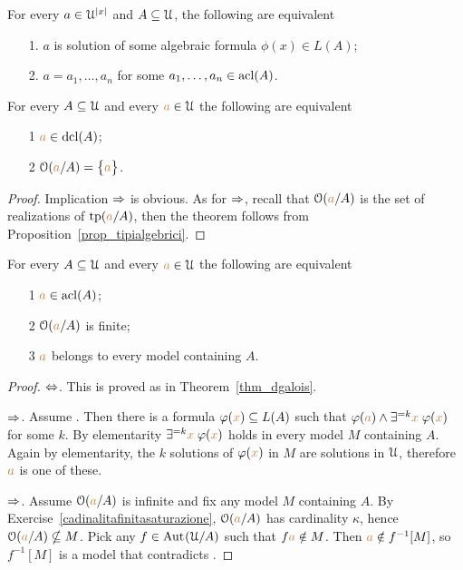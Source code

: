 \begin{exercise}
For every $a\in\EuScript U^{|x|}$ and $A\subseteq\EuScript U$, the following are equivalent
\begin{itemize}
\item[1.] $a$ is solution of some algebraic formula  $\phi(x)\in L(A)$;
\item[2.] $a=a_1,\dots,a_n$ for some $a_1,\dots,a_n\in\mathop{\rm acl}(A)$.\QED
\end{itemize}
\end{exercise}

\begin{theorem}\label{thm_dgalois}
For every $A\subseteq\EuScript U$ and every ${\color{brown} a}\in\EuScript U$ the following are equivalent
\begin{itemize}
\item[1] ${\color{brown} a}\in\mathop{\rm dcl}(A)$;
\item[2] $\EuScript O({\color{brown} a}/A)=\big\{{\color{brown} a}\big\}$.
\end{itemize}
\end{theorem}

\begin{proof} 
Implication $\Rightarrow$ is obvious.
As for  $\Rightarrow$, recall that $\EuScript O({\color{brown} a}/A)$ is the set of realizations of ${\rm tp}({\color{brown} a}/A)$, 
then the theorem follows from Proposition~\ref{prop_tipialgebrici}.
\end{proof}

\begin{theorem}\label{thm_fmgalois}
For every $A\subseteq\EuScript U$ and every ${\color{brown} a}\in\EuScript U$ the following are equivalent
\begin{itemize}
\item[1] ${\color{brown} a}\in\mathop{\rm acl}(A)$;
\item[2] $\EuScript O({\color{brown} a}/A)$ is finite;
\item[3] ${\color{brown} a}$ belongs to every model containing $A$.
\end{itemize}
\end{theorem}

\begin{proof} $\Leftrightarrow$.
This is proved as in Theorem~\ref{thm_dgalois}.

$\Rightarrow$.
Assume .
Then there is a formula $\varphi({\color{brown} x})\subseteq L(A)$ such that $\varphi({\color{brown} a})\wedge\exists^{=k}{\color{brown} x}\;\varphi({\color{brown} x})$ for some $k$.
By elementarity $\exists^{=k}{\color{brown} x}\;\varphi({\color{brown} x})$ holds in every model $M$ containing $A$.
Again by elementarity, the $k$ solutions of $\varphi({\color{brown} x})$ in $M$ are solutions in $\EuScript U$, therefore ${\color{brown} a}$ is one of these.

$\Rightarrow$.
Assume $\EuScript O({\color{brown} a}/A)$ is infinite and fix any model $M$ containing $A$.
By Exercise~\ref{cadinalitafinitasaturazione}, $\EuScript O({\color{brown} a}/A)$  has cardinality $\kappa$, hence $\EuScript O({\color{brown} a}/A)\nsubseteq M$.
Pick any $f\in{\rm Aut\kern.15ex}(\EuScript U/A)$ such that $f{\color{brown} a}\notin M$.
Then ${\color{brown} a}\notin f^{-1}[M]$, so $f^{-1}[M]$ is a model that contradicts .
\end{proof}

